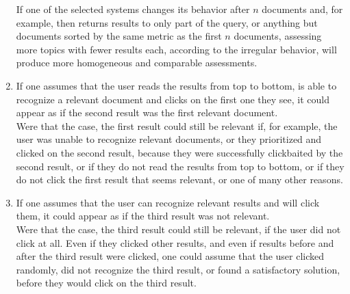 \documentclass[10pt,a4paper]{article}
\begin{document}
\begin{enumerate}
        If one of the selected systems changes its behavior after $n$ documents and, for example, then returns results to only part of the query, or anything but documents sorted by the same metric as the first $n$ documents, assessing more topics with fewer results each, according to the irregular behavior,  will produce more homogeneous and comparable assessments.
    \item If one assumes that the user reads the results from top to bottom, is able to recognize a relevant document and clicks on the first one they see, it could appear as if the second result was the first relevant document.\\
        Were that the case, the first result could still be relevant if, for example, the user was unable to recognize relevant documents, or they prioritized and clicked on the second result, because they were successfully clickbaited by the second result, or if they do not read the results from top to bottom, or if they do not click the first result that seems relevant, or one of many other reasons.
    \item If one assumes that the user can recognize relevant results and will click them, it could appear as if the third result was not relevant.\\
    Were that the case, the third result could still be relevant, if the user did not click at all. Even if they clicked other results, and even if results before and after the third result were clicked, one could assume that the user clicked randomly, did not recognize the third result, or found a satisfactory solution, before they would click on the third result.
\end{enumerate}
\end{document}
